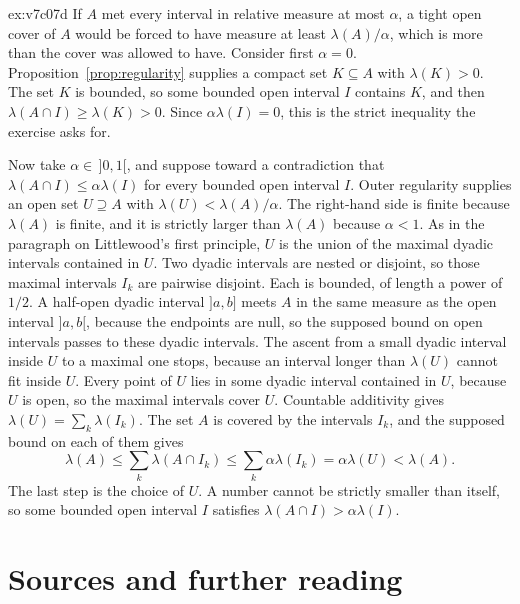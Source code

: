 \begin{solution}{ex:v7c07d}
\idea If $A$ met every interval in relative measure at most $\alpha$, a tight open cover of $A$ would be forced to have measure at least $\lambda(A)/\alpha$, which is more than the cover was allowed to have.
\writeup Consider first $\alpha=0$.
Proposition~\ref{prop:regularity} supplies a compact set $K\subseteq A$ with $\lambda(K)>0$.
The set $K$ is bounded, so some bounded open interval $I$ contains $K$, and then $\lambda(A\cap I)\ge\lambda(K)>0$.
Since $\alpha\lambda(I)=0$, this is the strict inequality the exercise asks for.

Now take $\alpha\in\,]0,1[$, and suppose toward a contradiction that $\lambda(A\cap I)\le\alpha\lambda(I)$ for every bounded open interval $I$.
Outer regularity supplies an open set $U\supseteq A$ with $\lambda(U)<\lambda(A)/\alpha$.
The right-hand side is finite because $\lambda(A)$ is finite, and it is strictly larger than $\lambda(A)$ because $\alpha<1$.
As in the paragraph on Littlewood's first principle, $U$ is the union of the maximal dyadic intervals contained in $U$.
Two dyadic intervals are nested or disjoint, so those maximal intervals $I_k$ are pairwise disjoint.
Each is bounded, of length a power of $1/2$.
A half-open dyadic interval $]a,b]$ meets $A$ in the same measure as the open interval $]a,b[$, because the endpoints are null, so the supposed bound on open intervals passes to these dyadic intervals.
The ascent from a small dyadic interval inside $U$ to a maximal one stops, because an interval longer than $\lambda(U)$ cannot fit inside $U$.
Every point of $U$ lies in some dyadic interval contained in $U$, because $U$ is open, so the maximal intervals cover $U$.
Countable additivity gives $\lambda(U)=\sum_k\lambda(I_k)$.
The set $A$ is covered by the intervals $I_k$, and the supposed bound on each of them gives
\[
\lambda(A)\le\sum_k\lambda(A\cap I_k)\le\sum_k\alpha\lambda(I_k)=\alpha\lambda(U)<\lambda(A).
\]
The last step is the choice of $U$.
A number cannot be strictly smaller than itself, so some bounded open interval $I$ satisfies $\lambda(A\cap I)>\alpha\lambda(I)$.
\end{solution}

\section*{Sources and further reading}

